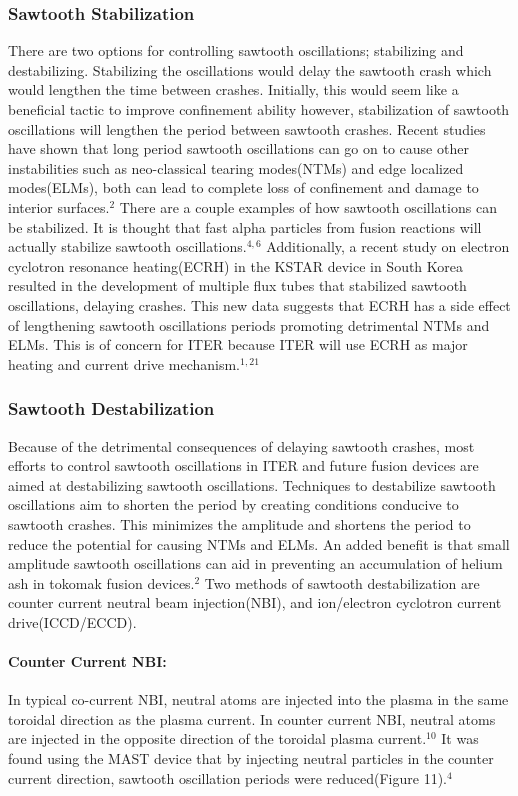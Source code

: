 \documentclass{article}
\begin{document}
\subsubsection{Sawtooth Stabilization}
There are two options for controlling sawtooth oscillations; stabilizing and destabilizing.  Stabilizing the oscillations would delay the sawtooth crash which would lengthen the time between crashes.  Initially, this would seem like a beneficial tactic to improve confinement ability however, stabilization of sawtooth oscillations will lengthen the period between sawtooth crashes.  Recent studies have shown that long period sawtooth oscillations can go on to cause other instabilities such as neo-classical tearing modes(NTMs) and edge localized modes(ELMs), both can lead to complete loss of confinement and damage to interior surfaces.$^{2}$  There are a couple examples of how sawtooth oscillations can be stabilized.  It is thought that fast alpha particles from fusion reactions will actually stabilize sawtooth oscillations.$^{4,6}$   Additionally, a recent study on electron cyclotron resonance heating(ECRH) in the KSTAR device in South Korea resulted in the development of multiple flux tubes that stabilized sawtooth oscillations, delaying crashes.  This new data suggests that ECRH has a side effect of lengthening sawtooth oscillations periods promoting detrimental NTMs and ELMs.  This is of concern for ITER because ITER will use ECRH as major heating and current drive mechanism.$^{1,21}$
\subsubsection{Sawtooth Destabilization}
Because of the detrimental consequences of delaying sawtooth crashes, most efforts to control sawtooth oscillations in ITER and future fusion devices are aimed at destabilizing sawtooth oscillations.  Techniques to destabilize sawtooth oscillations aim to shorten the period by creating conditions conducive to sawtooth crashes.  This minimizes the amplitude and shortens the period to reduce the potential for causing NTMs and ELMs.  An added benefit is that small amplitude sawtooth oscillations can aid in preventing an accumulation of helium ash in tokomak fusion devices.$^{2}$  Two methods of sawtooth destabilization are counter current neutral beam injection(NBI), and ion/electron cyclotron current drive(ICCD/ECCD).
\paragraph{Counter Current NBI:}
In typical co-current NBI, neutral atoms are injected into the plasma in the same toroidal direction as the plasma current.  In counter current NBI, neutral atoms are injected in the opposite direction of the toroidal plasma current.$^{10}$  It was found using the MAST device that by injecting neutral particles in the counter current direction, sawtooth oscillation periods were reduced(Figure 11).$^{4}$
\newpage
\end{document}
